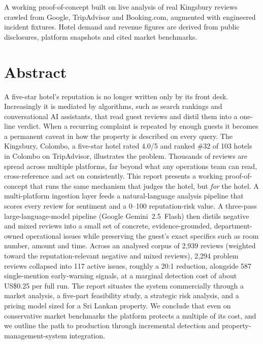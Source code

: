 \documentclass[11pt,a4paper]{article}
\begin{document}
\begin{titlepage}
\vfill
{\small\color{midgray} A working proof-of-concept built on live analysis of real Kingsbury reviews crawled
from Google, TripAdvisor and Booking.com, augmented with engineered incident fixtures.
Hotel demand and revenue figures are derived from public disclosures, platform snapshots and cited
market benchmarks.}
\end{titlepage}

\section*{Abstract}
A five-star hotel's reputation is no longer written only by its front desk. Increasingly it is
mediated by algorithms, such as search rankings and conversational AI assistants, that read guest
reviews and distil them into a one-line verdict. When a recurring complaint is repeated by enough
guests it becomes a permanent caveat in how the property is described on every query. The Kingsbury,
Colombo, a five-star hotel rated 4.0/5 and ranked \#32 of 103 hotels in Colombo on TripAdvisor,
illustrates the problem. Thousands of reviews are spread across multiple platforms, far beyond what
any operations team can read, cross-reference and act on consistently.
This report presents a working proof-of-concept that runs the same mechanism that judges the hotel,
but \emph{for} the hotel. A multi-platform ingestion layer feeds a natural-language analysis pipeline
that scores every review for sentiment and a 0--100 reputation-risk value. A three-pass
large-language-model pipeline (Google Gemini~2.5~Flash) then distils negative and mixed reviews into a
small set of concrete, evidence-grounded, department-owned operational issues while preserving the
guest's exact specifics such as room number, amount and time. Across an analysed corpus of 2{,}939
reviews (weighted toward the reputation-relevant negative and mixed reviews), 2{,}294 problem reviews
collapsed into 117 active issues, roughly a 20:1 reduction, alongside 587 single-mention early-warning
signals, at a marginal detection cost of about US\$0.25 per full run. The report situates the system
commercially through a market analysis, a five-part feasibility study, a strategic risk analysis,
and a pricing model sized for a Sri Lankan property. We conclude that even on conservative market
benchmarks the platform protects a multiple of its cost, and we outline the path to production through incremental
detection and property-management-system integration.
\end{document}

